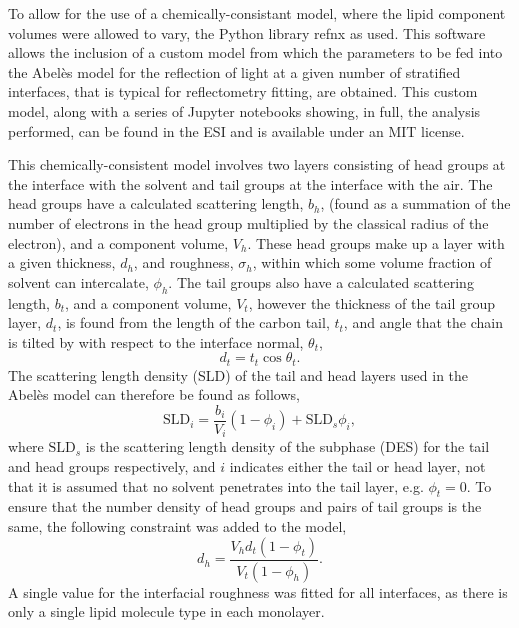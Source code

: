 \documentclass[twoside,twocolumn,9pt]{article}
\begin{document}
To allow for the use of a chemically-consistant model, where the lipid component volumes were allowed to vary, the Python library refnx\cite{Nelson2018} as used. This software allows the inclusion of a custom model from which the parameters to be fed into the Abel\`{e}s model for the reflection of light at a given number of stratified interfaces,\cite{Abeles1950,Parratt1954} that is typical for reflectometry fitting, are obtained. This custom model, along with a series of Jupyter notebooks showing, in full, the analysis performed, can be found in the ESI and is available under an MIT license.\cite{mccluskey_2018} 

This chemically-consistent model involves two layers consisting of head groups at the interface with the solvent and tail groups at the interface with the air. The head groups have a calculated scattering length, $b_h$, (found as a summation of the number of electrons in the head group multiplied by the classical radius of the electron), and a component volume, $V_h$. These head groups make up a layer with a given thickness, $d_h$, and roughness, $\sigma_h$, within which some volume fraction of solvent can intercalate, $\phi_h$. The tail groups also have a calculated scattering length, $b_t$, and a component volume, $V_t$, however the thickness of the tail group layer, $d_t$, is found from the length of the carbon tail, $t_t$, and angle that the chain is tilted by with respect to the interface normal, $\theta_t$, 
\begin{equation}
\label{equ:tl}
d_t = t_t \cos{\theta_t}.
\end{equation}
The scattering length density (SLD) of the tail and head layers used in the Abel\`{e}s model can therefore be found as follows, 
\begin{equation}
\text{SLD}_i = \frac{b_i}{V_i}(1 - \phi_i) + \text{SLD}_{s}\phi_i,
\end{equation}
where $\text{SLD}_{s}$ is the scattering length density of the subphase (DES) for the tail and head groups respectively, and $i$ indicates either the tail or head layer, not that it is assumed that no solvent penetrates into the tail layer, e.g. $\phi_t = 0$. To ensure that the number density of head groups and pairs of tail groups is the same, the following constraint was added to the model,\cite{Braun2017}
\begin{equation}
\label{equ:ht}
d_h = \frac{V_hd_t(1-\phi_t)}{V_t(1-\phi_h)}. 
\end{equation}
A single value for the interfacial roughness was fitted for all interfaces, as there is only a single lipid molecule type in each monolayer.
\end{document}
